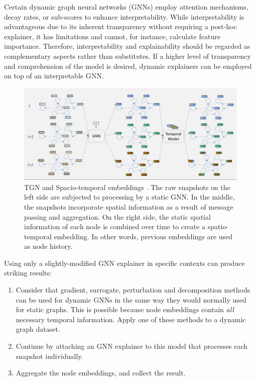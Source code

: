 Certain dynamic graph neural networks (GNNs) employ attention mechanisms, decay rates, or sub-scores to enhance interpretability. While interpretability is advantageous due to its inherent transparency without requiring a post-hoc explainer, it has limitations and cannot, for instance, calculate feature importance\cite{yao_interpretable_2021}. Therefore, interpretability and explainability should be regarded as complementary aspects rather than substitutes. If a higher level of transparency and comprehension of the model is desired, dynamic explainers can be employed on top of an interpretable GNN.

\clearpage
\begin{figure}
    \centering
    \includegraphics[width=\textwidth]{images/tgn-embedding-white.png}
    \caption{TGN and Spacio-temporal embeddings \cite{deepfindr_friendly_2021}. The raw snapshots on the left side are subjected to processing by a static GNN. In the middle, the snapshots incorporate spatial information as a result of message passing and aggregation. On the right side, the static spatial information of each node is combined over time to create a spatio-temporal embedding. In other words, previous embeddings are used as node history.}
    \label{fig:tgn-embedding}
\end{figure}

Using only a slightly-modified GNN explainer in specific contexts can produce striking results:
\begin{enumerate}
    \item Consider that gradient, surrogate, perturbation and decomposition methods can be used for dynamic GNNs in the same way they would normally used for static graphs. This is possible because node embeddings contain \textit{all} necessary temporal information. Apply one of these methods to a dynamic graph dataset.
    \item Continue by attaching an GNN explainer to this model that processes each snapshot individually.
    \item Aggregate the node embeddings, and collect the result.
\end{enumerate}

